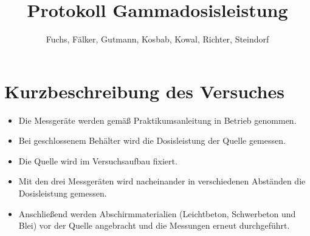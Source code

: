 \documentclass[12pt,german]{article}
\title{\vspace{-1.5cm}Protokoll Gammadosisleistung}
\author{Fuchs, Fälker, Gutmann, Kosbab, Kowal, Richter, Steindorf}
\begin{document}
    \maketitle
    \tableofcontents

    \section{Kurzbeschreibung des Versuches}
    \begin{itemize}
        \item Die Messgeräte werden gemäß Praktikumsanleitung in Betrieb genommen. 
        \item Bei geschlossenem Behälter wird die Dosisleistung der Quelle gemessen.
        \item Die Quelle wird im Versuchsaufbau fixiert.
        \item Mit den drei Messgeräten wird nacheinander in verschiedenen Abständen die Dosisleistung gemessen.
        \item Anschließend werden Abschirmmaterialien (Leichtbeton, Schwerbeton und Blei) vor der Quelle angebracht und die Messungen erneut durchgeführt.
    \end{itemize}
\end{document}
